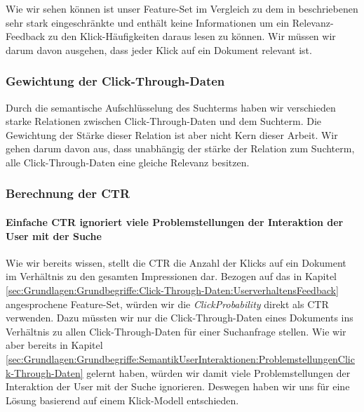 Wie wir sehen können ist unser Feature-Set im Vergleich zu dem in \cite{IWUSBI} beschriebenen sehr stark eingeschränkte und enthält keine Informationen um ein Relevanz-Feedback zu den Klick-Häufigkeiten daraus lesen zu können. Wir müssen wir darum davon ausgehen, dass jeder Klick auf ein Dokument relevant ist.

\subsubsection{Gewichtung der Click-Through-Daten}
\label{sec:Reranking:Methodik:Click-Through-Daten:Gewichtung}

Durch die semantische Aufschlüsselung des Suchterms haben wir verschieden starke Relationen zwischen Click-Through-Daten und dem Suchterm. Die Gewichtung der Stärke dieser Relation ist aber nicht Kern dieser Arbeit. Wir gehen darum davon aus, dass unabhängig der stärke der Relation zum Suchterm, alle Click-Through-Daten eine gleiche Relevanz besitzen.

\subsubsection{Berechnung der CTR}
\label{sec:Reranking:Methodik:Click-Through-Daten:Gewichtung}

\paragraph{Einfache CTR ignoriert viele Problemstellungen der Interaktion der User mit der Suche} 
Wie wir bereits wissen, stellt die CTR die Anzahl der Klicks auf ein Dokument im Verhältnis zu den gesamten Impressionen dar. Bezogen auf das in Kapitel \ref{sec:Grundlagen:Grundbegriffe:Click-Through-Daten:UserverhaltensFeedback} angesprochene Feature-Set, würden wir die \textit{ClickProbability} direkt als CTR verwenden. Dazu müssten wir nur die Click-Through-Daten eines Dokuments ins Verhältnis zu allen Click-Through-Daten für einer Suchanfrage stellen. Wie wir aber bereits in Kapitel \ref{sec:Grundlagen:Grundbegriffe:SemantikUserInteraktionen:ProblemstellungenClick-Through-Daten} gelernt haben, würden wir damit viele Problemstellungen der Interaktion der User mit der Suche ignorieren. Deswegen haben wir uns für eine Lösung basierend auf einem Klick-Modell entschieden. 

